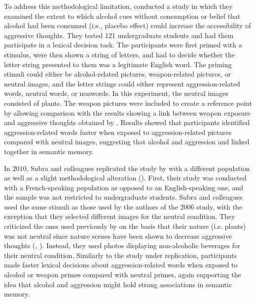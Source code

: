 \documentclass[serif, twocolumn, numeric, empirical]{jote-article}
\begin{document}
To address this methodological limitation, \textcite{BartholowHeinz2006} conducted a study in which they examined the extent to which alcohol cues without consumption or belief that alcohol had been consumed (i.e., placebo effect) could increase the accessibility of aggressive thoughts. They tested 121 undergraduate students and had them participate in a lexical decision task. The participants were first primed with a stimulus, were then shown a string of letters, and had to decide whether the letter string presented to them was a legitimate English word. The priming stimuli could either be alcohol-related pictures, weapon-related pictures, or neutral images, and the letter strings could either represent aggression-related words, neutral words, or nonwords. In this experiment, the neutral images consisted of plants. The weapon pictures were included to create a reference point by allowing comparison with the results showing a link between weapon exposure and aggressive thoughts obtained by \textcite{AndersonJrJBartholow1998}. Results showed that participants identified aggression-related words faster when exposed to aggression-related pictures compared with neutral images, suggesting that alcohol and aggression and linked together in semantic memory. 

In 2010, Subra and colleagues replicated the study by \textcite{BartholowHeinz2006} with a different population as well as a slight methodological alteration (\cite{SubraMullerBegueLBushmanDelmas2010}). First, their study was conducted with a French-speaking population as opposed to an English-speaking one, and the sample was not restricted to undergraduate students. Subra and colleagues used the same stimuli as those used by the authors of the 2006 study, with the exception that they selected different images for the neutral condition. They criticized the ones used previously by \textcite{BartholowHeinz2006} on the basis that their nature (i.e. plants) was not neutral since nature scenes have been shown to decrease aggressive thoughts (\cite{KuoSullivan2001}, \cite{KuoSullivan2001}). Instead, they used photos displaying non-alcoholic beverages for their neutral condition. Similarly to the study under replication, participants made faster lexical decisions about aggression-related words when exposed to alcohol or weapon primes compared with neutral primes, again supporting the idea that alcohol and aggression might hold strong associations in semantic memory.
\end{document}
